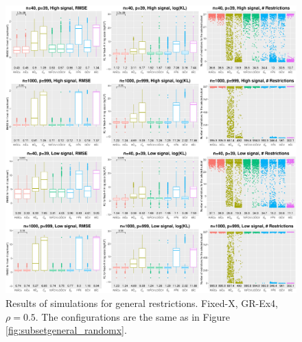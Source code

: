 \begin{figure}[!ht]
  \centering
  \includegraphics[width=\textwidth]{figures/main/fixedx_GR-Ex4.eps}
  \caption{Results of simulations for general restrictions. Fixed-X, GR-Ex4, $\rho=0.5$. The configurations are the same as in Figure \ref{fig:subsetgeneral_randomx}.}
  \label{fig:subsetgeneral_fixedx}
\end{figure}